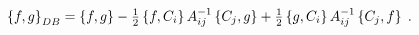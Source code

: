 \begin{equation}
\left\{  f,g\right\}  _{{\footnotesize DB}}=\left\{  f,g\right\}  -\tfrac
{1}{2}\left\{  f,C_{i}\right\}  A_{ij}^{-1}\left\{  C_{j},g\right\}
+\tfrac{1}{2}\left\{  g,C_{i}\right\}  A_{ij}^{-1}\left\{  C_{j},f\right\}
\;.
\end{equation}

